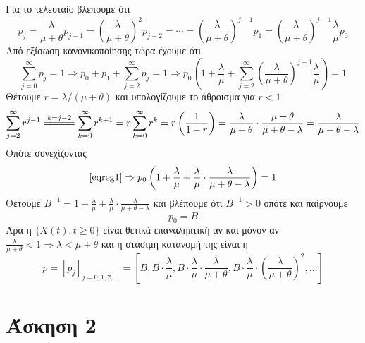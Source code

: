 \documentclass[a4paper,11pt]{article}
\begin{document}
Για το τελευταίο βλέπουμε ότι
\[
	p_j = \frac{\lambda}{\mu+\theta} p_{j-1} = \left(\frac{\lambda}{\mu+\theta}\right)^2 p_{j-2} = \cdots = \left(\frac{\lambda}{\mu+\theta}\right)^{j-1} p_1 = \left(\frac{\lambda}{\mu+\theta}\right)^{j-1} \frac{\lambda}{\mu} p_0
\]
Από εξίσωση κανονικοποίησης τώρα έχουμε ότι
\begin{equation}
	\label{eqreg1}
	\sum_{j=0}^\infty p_j = 1 \Rightarrow p_0 + p_1 + \sum_{j=2}^\infty p_j = 1 \Rightarrow p_0 \left(1 + \frac{\lambda}{\mu} + \sum_{j=2}^\infty \left(\frac{\lambda}{\mu+\theta}\right)^{j-1} \frac{\lambda}{\mu} \right) = 1
\end{equation}
Θέτουμε $r = \lambda/(\mu+\theta)$ και υπολογίζουμε το άθροισμα για $r<1$
\[
	\sum_{j=2}^\infty r^{j-1} \stackrel{k=j-2}{=\joinrel=\joinrel=\joinrel=\joinrel=}  \sum_{k=0}^\infty r^{k+1} = r \sum_{k=0}^\infty r^k = r \left(\frac{1}{1-r}\right) = \frac{\lambda}{\mu+\theta} \cdot \frac{\mu+\theta}{\mu+\theta-\lambda} = \frac{\lambda}{\mu+\theta-\lambda}
\]
Οπότε συνεχίζοντας
\[
	\eqref{eqreg1} \Rightarrow p_0 \left(1 + \frac{\lambda}{\mu} + \frac{\lambda}{\mu} \cdot \frac{\lambda}{\mu+\theta-\lambda} \right) = 1
\]
Θέτουμε $B^{-1} = 1 + \frac{\lambda}{\mu} + \frac{\lambda}{\mu} \cdot \frac{\lambda}{\mu+\theta-\lambda}$ και βλέπουμε ότι $B^{-1} > 0$ οπότε και παίρνουμε
\[p_0 = B\]
Άρα η $\{X(t),t\geq 0\}$ είναι θετικά επαναληπτική αν και μόνον αν $\frac{\lambda}{\mu+\theta} < 1 \Rightarrow \lambda < \mu+\theta$ και η στάσιμη κατανομή της είναι η
\[
	p = [p_j]_{j=0,1,2,\dots} = \left[B, B \cdot \frac{\lambda}{\mu}, B \cdot \frac{\lambda}{\mu} \cdot \frac{\lambda}{\mu+\theta}, B \cdot \frac{\lambda}{\mu} \cdot \left(\frac{\lambda}{\mu+\theta}\right)^2, \dots\right]
\]


\section*{Άσκηση 2}
\end{document}
